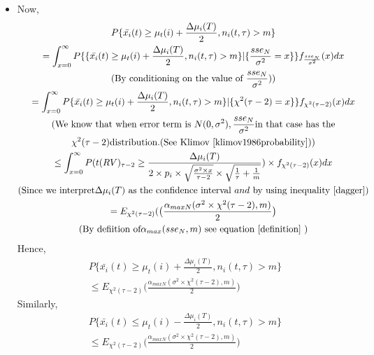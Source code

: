 \documentclass[compress, serif, onlymath, professionalfonts]{beamer}
\begin{document}
\begin{frame}[t,allowframebreaks]
\begin{enumerate}
\begin{itemize}
\item
Now,
\begin{multline}
P\{\bar{x_i}(t) \geq \mu_t(i) +\frac{\Delta\mu_i(T)}{2}, n_i(t,\tau)> m\} \\ 
=\int_{x=0}^{\infty}P\{\{\bar{x_i}(t) \geq \mu_t(i) +\frac{\Delta\mu_i(T)}{2}, n_i(t,\tau)> m\}|\{\frac{sse_N}{\sigma^2 }= x\}\}f_{\frac{sse_N}{\sigma^2  }}(x)dx\\
(\text{By conditioning on the value of } \frac{sse_N}{\sigma^2 }))\\
=\int_{x=0}^{\infty}P\{\bar{x_i}(t) \geq \mu_t(i) +\frac{\Delta\mu_i(T)}{2}, n_i(t,\tau)> m\}|\{\chi^2(\tau-2)= x\}\}f_{\chi^2(\tau-2)}(x)dx\\
(\text{We know that when error term is }N(0,\sigma^2), \frac{sse_N}{\sigma^2} \text{in that case has the} \\ \chi^2(\tau-2) \text{distribution.}\text{(See Klimov \cite{klimov1986probability})})\\
\leq \int_{x=0}^{\infty}P(t(RV)_{\tau-2}\geq \frac{\Delta\mu_i(T)}{2\times p_i \times \sqrt\frac{\sigma^2\times x}{\tau-2} \times \sqrt{\frac{1}{\tau}+\frac{1}{m}}}  )\times f_{\chi^2(\tau-2)}(x)dx \\
(\text{Since we interpret}  \Delta\mu_i(T)  \text{ as the confidence interval }  and \text{ by using inequality \ref{dagger}})\\
= E_{\chi^2(\tau-2)}(\big(\frac{\alpha_{maxN}(\sigma^2\times\chi^2(\tau-2),m)}{2}\big)\\
(\text{By defiition of} \alpha_{max}(sse_{N},m) \text{ see equation \ref{definition} })
\end{multline}
Hence,
\begin{multline}\label{eq_11_1}
P\{\bar{x_i}(t) \geq \mu_t(i) +\frac{\Delta\mu_i(T)}{2}, n_i(t,\tau)> m\} \\ \leq E_{\chi^2(\tau-2)}\big(\frac{\alpha_{maxN}(\sigma^2\times\chi^2(\tau-2),m)}{2}\big)
\end{multline}
Similarly,
\begin{multline}
\label{eq_12_1}
P\{\bar{x_i}(t) \leq \mu_t(i)-\frac{\Delta\mu_i(T)}{2}, n_i(t,\tau)> m\} \\ \leq E_{\chi^2(\tau-2)}\big(\frac{\alpha_{maxN}(\sigma^2\times\chi^2(\tau-2),m)}{2}\big)
\end{multline}


\end{itemize}
\end{enumerate}
\end{frame}
\end{document}
